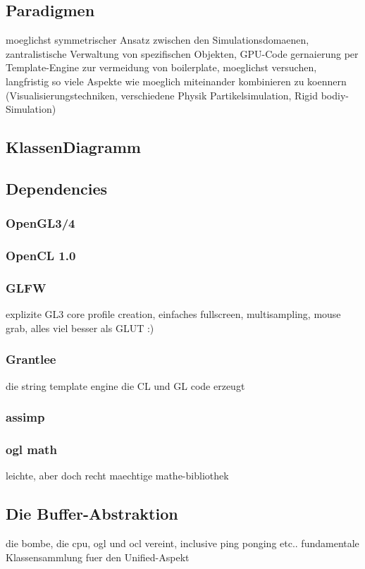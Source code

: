 
	
\subsection{Paradigmen}
	
	moeglichst symmetrischer Ansatz zwischen den Simulationsdomaenen,
	 zantralistische Verwaltung von spezifischen Objekten,
	GPU-Code gernaierung per Template-Engine zur vermeidung von boilerplate,
	moeglichst versuchen, langfristig so viele Aspekte wie moeglich miteinander kombinieren zu koennern 	    
	(Visualisierungstechniken, verschiedene Physik Partikelsimulation, Rigid bodiy-Simulation) 

\subsection{KlassenDiagramm}

\subsection{Dependencies}

	
	\subsubsection{OpenGL3/4}
    \subsubsection{OpenCL 1.0}
    \subsubsection{GLFW}
    	explizite GL3 core profile creation, einfaches fullscreen, multisampling, mouse grab, alles viel besser als GLUT :)
    \subsubsection{Grantlee}
       die string template engine die CL und GL code erzeugt
    \subsubsection{assimp}
    \subsubsection{ogl math}
    	leichte, aber doch recht maechtige mathe-bibliothek
    	
    	
\subsection{Die Buffer-Abstraktion}   	
 	die bombe, die cpu, ogl und ocl vereint, inclusive ping ponging etc.. fundamentale Klassensammlung fuer den Unified-Aspekt
 
